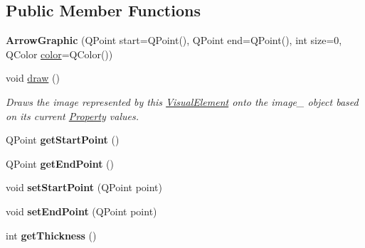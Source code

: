 \subsection*{Public Member Functions}
\begin{DoxyCompactItemize}
\item 
\hypertarget{class_picto_1_1_arrow_graphic_aafdecea034a52d4270db4dd3f5d1dfd3}{{\bfseries Arrow\-Graphic} (Q\-Point start=Q\-Point(), Q\-Point end=Q\-Point(), int size=0, Q\-Color \hyperlink{struct_picto_1_1_visual_element_a45c3042c969717eb2ab60373369c7de7}{color}=Q\-Color())}\label{class_picto_1_1_arrow_graphic_aafdecea034a52d4270db4dd3f5d1dfd3}

\item 
\hypertarget{class_picto_1_1_arrow_graphic_aca5d920a70b962387c17f8bfba6f3918}{void \hyperlink{class_picto_1_1_arrow_graphic_aca5d920a70b962387c17f8bfba6f3918}{draw} ()}\label{class_picto_1_1_arrow_graphic_aca5d920a70b962387c17f8bfba6f3918}

\begin{DoxyCompactList}\small\item\em Draws the image represented by this \hyperlink{struct_picto_1_1_visual_element}{Visual\-Element} onto the image\-\_\- object based on its current \hyperlink{class_picto_1_1_property}{Property} values. \end{DoxyCompactList}\item 
\hypertarget{class_picto_1_1_arrow_graphic_aaf85d398ea6f2d844d31649cbc674a9b}{Q\-Point {\bfseries get\-Start\-Point} ()}\label{class_picto_1_1_arrow_graphic_aaf85d398ea6f2d844d31649cbc674a9b}

\item 
\hypertarget{class_picto_1_1_arrow_graphic_aa7b5e00069a9f180b5d4b4b4f3c2526f}{Q\-Point {\bfseries get\-End\-Point} ()}\label{class_picto_1_1_arrow_graphic_aa7b5e00069a9f180b5d4b4b4f3c2526f}

\item 
\hypertarget{class_picto_1_1_arrow_graphic_a8ce70ea2bf40956f18895e591671e535}{void {\bfseries set\-Start\-Point} (Q\-Point point)}\label{class_picto_1_1_arrow_graphic_a8ce70ea2bf40956f18895e591671e535}

\item 
\hypertarget{class_picto_1_1_arrow_graphic_ae7ba4437a30f9a436967930fd2849f01}{void {\bfseries set\-End\-Point} (Q\-Point point)}\label{class_picto_1_1_arrow_graphic_ae7ba4437a30f9a436967930fd2849f01}

\item 
\hypertarget{class_picto_1_1_arrow_graphic_add6770a805e3660bac0fdf6f727e555e}{int {\bfseries get\-Thickness} ()}\label{class_picto_1_1_arrow_graphic_add6770a805e3660bac0fdf6f727e555e}


\end{DoxyCompactItemize}

